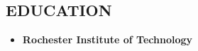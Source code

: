 \documentclass[margin]{res}
\begin{document}
\begin{resume}


    \section{EDUCATION}
      \begin{itemize}
        \item[] \textbf{Rochester Institute of Technology}
      \end{itemize}



\end{resume}
\end{document}
